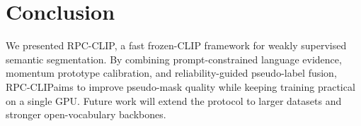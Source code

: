 \documentclass[letterpaper]{article}
\newcommand{\method}{RPC-CLIP}
\begin{document}
\section{Conclusion}
We presented \method, a fast frozen-CLIP framework for weakly supervised
semantic segmentation. By combining prompt-constrained language evidence,
momentum prototype calibration, and reliability-guided pseudo-label fusion,
\method aims to improve pseudo-mask quality while keeping training practical on a
single GPU. Future work will extend the protocol to larger datasets and stronger
open-vocabulary backbones.



\end{document}
